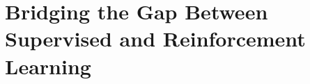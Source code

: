 
\chapter{Bridging the Gap Between Supervised and Reinforcement Learning} %
\label{ch:upside_down_rl} %


